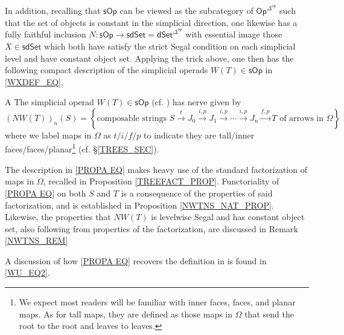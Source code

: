\documentclass[a4paper,10pt
,draft
]{article}%
\numberwithin{equation}{section}
\numberwithin{figure}{section}
\theoremstyle{definition} %
\newcommand{\Op}{\mathsf{Op}}%
\newcommand{\sOp}{\ensuremath{\mathsf{sOp}}}%
\newcommand{\1}{\ensuremath{\mathbbm 1}}%
\begin{document}
In addition, recalling that $\sOp$ can be viewed as the subcategory
of $\Op^{\Delta^{op}}$ such that the set of objects is constant in the simplicial direction,
one likewise has a fully faithful inclusion
$N\colon \sOp \to \mathsf{sdSet} = \mathsf{dSet}^{\Delta^{op}}$
with essential image those
$X \in \mathsf{sdSet}$
which both have satisfy the strict Segal condition on each simplicial level and have constant object set. 
Applying the trick above,
one then has the following compact description
of the simplicial operads $W(T) \in \sOp$ in \eqref{WXDEF_EQ}.

\begin{customprop}{A}\label{PROPA PROP}
The simplicial operad $W(T) \in \sOp$
(cf. \cite[(4.1)]{CM13b})
has nerve given by
\begin{equation}\label{PROPA EQ}
	\left(NW(T)\right)_{n}(S)
=
	\left\{
	\text{composable strings }
	S \xrightarrow{t} 
	J_0 \xrightarrow{i,p} 
	J_1 \xrightarrow{i,p} 
	\cdots \xrightarrow{i,p}
	J_n \xrightarrow{f,p}
	T
	\text{ of arrows in $\Omega$}
\right\}
\end{equation}
where we label maps in $\Omega$ as
$t/i/f/p$
to indicate they are 
tall/inner faces/faces/planar\footnote{
We expect most readers will be familiar with inner faces, faces, and planar maps. 
As for tall maps, they are defined 
as those maps in $\Omega$
that send the root to the root and leaves to leaves.
}
(cf. \S \ref{TREES_SEC}).
\end{customprop}
The description in \eqref{PROPA EQ}
makes heavy use of the standard factorization of maps in $\Omega$,
recalled in Proposition \ref{TREEFACT_PROP}.
Functoriality of \eqref{PROPA EQ} on both $S$ and $T$
is a consequence of the properties of said factorization,
and is established in Proposition \ref{NWTNS_NAT_PROP}.
Likewise, the properties that 
$NW(T)$ is levelwise Segal and 
has constant object set, also following from properties of the factorization, are discussed in Remark \ref{NWTNS_REM}

A discussion of how \eqref{PROPA EQ}
recovers the definition in \cite[(4.1)]{CM13b} 
is found in \eqref{WU_EQ2}.
\end{document}

